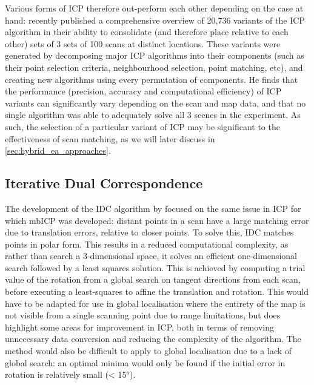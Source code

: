 \documentclass[authoryearcitations]{UoYCSproject}
\begin{document}
Various forms of ICP therefore out-perform each other depending on the case at hand: \citet{Donoso2017-wp} recently published a comprehensive overview of 20,736 variants of the ICP algorithm in their ability to consolidate (and therefore place relative to each other) sets of 3 sets of 100 scans at distinct locations. These variants were generated by decomposing major ICP algorithms into their components (such as their point selection criteria, neighbourhood selection, point matching, etc), and creating new algorithms using every permutation of components. He finds that the performance (precision, accuracy and computational efficiency) of ICP variants can significantly vary depending on the scan and map data, and that no single algorithm was able to adequately solve all 3 scenes in the experiment. As such, the selection of a particular variant of ICP may be significant to the effectiveness of scan matching, as we will later discuss in \ref{sec:hybrid_ea_approaches}.


\subsection{Iterative Dual Correspondence}

The development of the IDC algorithm by \citet{Lu1997-zv} focused on the same issue in ICP for which mbICP was developed: distant points in a scan have a large matching error due to translation errors, relative to closer points. To solve this, IDC matches points in polar form. This results in a reduced computational complexity, as rather than search a 3-dimensional space, it solves an efficient one-dimensional search followed by a least squares solution. This is achieved by computing a trial value of the rotation from a global search on tangent directions from each scan, before executing a least-squares to affine the translation and rotation. This would have to be adapted for use in global localisation where the entirety of the map is not visible from a single scanning point due to range limitations, but does highlight some areas for improvement in ICP, both in terms of removing unnecessary data conversion and reducing the complexity of the algorithm. The method would also be difficult to apply to global localisation due to a lack of global search: an optimal minima would only be found if the initial error in rotation is relatively small (< 15$^o$).
\end{document}
